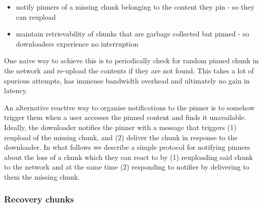\begin{itemize}
    \item  notify pinners of a missing chunk belonging to the content they pin - so they can reupload
    \item  maintain retrievability of chunks that are garbage collected but pinned - so downloaders experience no interruption 
\end{itemize}

One naive way to achieve this is to periodically check for random pinned chunk in the network and re-upload the contents if they are not found. This takes a lot of spurious attempts, has immense bandwidth overhead and ultimately no gain in latency.

An alternative reactive way to organise notifications to the pinner is to somehow trigger them when a user accesses the pinned content and finds it unavailable. Ideally, the downloader notifies the pinner with a message that triggers (1) reupload of the missing chunk, and (2) deliver the chunk in response to the downloader.  
In what follows we describe a simple protocol for notifying pinners about the loss of a chunk which they can react to by (1) reuploading said chunk to the network and at the same time (2) responding to notifier by delivering to them the missing chunk.


\subsubsection{Recovery chunks}

